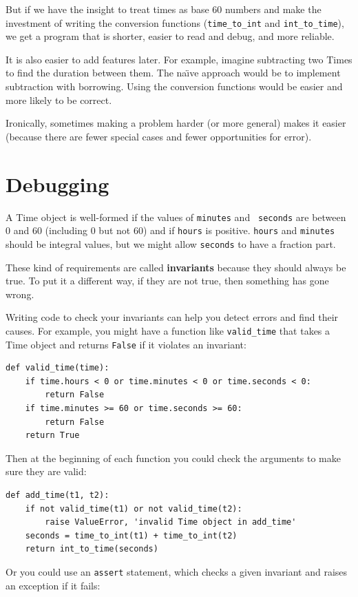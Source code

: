 \documentclass[10pt]{book}
\begin{document}
But if we have the insight to treat times as base 60 numbers and make
the investment of writing the conversion functions (\verb"time_to_int"
and \verb"int_to_time"), we get a program that is shorter, easier to
read and debug, and more reliable.

It is also easier to add features later.  For example, imagine
subtracting two Times to find the duration between them.  The
na\"{\i}ve approach would be to implement subtraction with borrowing.
Using the conversion functions would be easier and more likely to be
correct.


Ironically, sometimes making a problem harder (or more general) makes it
easier (because there are fewer special cases and fewer opportunities
for error).


\section{Debugging}

A Time object is well-formed if the values of {\tt minutes} and {\tt
seconds} are between 0 and 60 (including 0 but not 60) and if 
{\tt hours} is positive.  {\tt hours} and {\tt minutes} should be
integral values, but we might allow {\tt seconds} to have a
fraction part.


These kind of requirements are called {\bf invariants} because
they should always be true.  To put it a different way, if they
are not true, then something has gone wrong.

Writing code to check your invariants can help you detect errors
and find their causes.  For example, you might have a function
like \verb"valid_time" that takes a Time object and returns
{\tt False} if it violates an invariant:

\beforeverb
\begin{verbatim}
def valid_time(time):
    if time.hours < 0 or time.minutes < 0 or time.seconds < 0:
        return False
    if time.minutes >= 60 or time.seconds >= 60:
        return False
    return True
\end{verbatim}
\afterverb
%
Then at the beginning of each function you could check the
arguments to make sure they are valid:


\beforeverb
\begin{verbatim}
def add_time(t1, t2):
    if not valid_time(t1) or not valid_time(t2):
        raise ValueError, 'invalid Time object in add_time'
    seconds = time_to_int(t1) + time_to_int(t2)
    return int_to_time(seconds)
\end{verbatim}
\afterverb
%
Or you could use an {\tt assert} statement, which checks a given invariant
and raises an exception if it fails:
\end{document}

